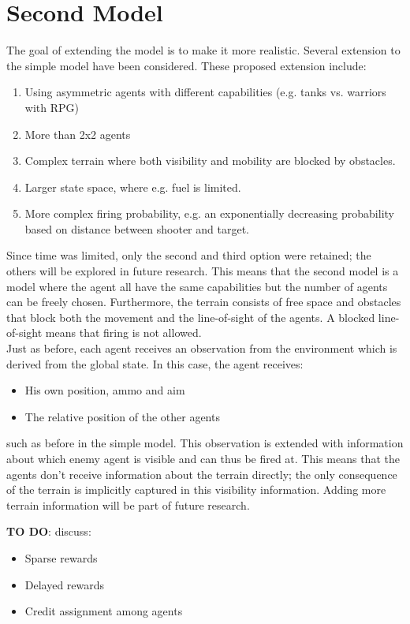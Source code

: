 \section{Second Model}
The goal of extending the model is to make it more realistic. Several extension to the simple model have been considered. These proposed extension include:
\begin{enumerate}
    \item Using asymmetric agents with different capabilities (e.g. tanks vs. warriors with RPG)
    \item More than 2x2 agents
    \item Complex terrain where both visibility and mobility are blocked by obstacles.
    \item Larger state space, where e.g. fuel is limited.
    \item More complex firing probability, e.g. an exponentially decreasing probability based on distance between shooter and target.
\end{enumerate}
Since time was limited, only the second and third option were retained; the others will be explored in future research. This means that the second model is a model where the agent all have the same capabilities but the number of agents can be freely chosen. Furthermore, the terrain consists of free space and obstacles that block both the movement and the line-of-sight of the agents. A blocked line-of-sight means that firing is not allowed.\\
Just as before, each agent receives an observation from the environment which is derived from the global state. In this case, the agent receives:
\begin{itemize}
    \item His own position, ammo and aim
    \item The relative position of the other agents
\end{itemize}
such as before in the simple model. This observation is extended with information about which enemy agent is visible and can thus be fired at. This means that the agents don't receive information about the terrain directly; the only consequence of the terrain is implicitly captured in this visibility information. Adding more terrain information will be part of future research.

\textbf{TO DO}: discuss:
\begin{itemize}
    \item Sparse rewards
    \item Delayed rewards
    \item Credit assignment among agents
\end{itemize}